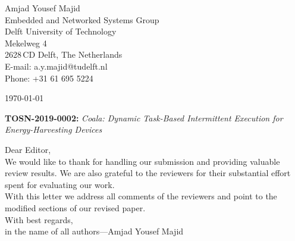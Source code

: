 \documentclass[10pt]{article}
\begin{document}
\pagestyle{myheadings}
\thispagestyle{empty}


\headsep 0.5cm

\bigskip\bigskip


\bigskip\bigskip

\begin{flushright}
Amjad Yousef Majid \\
Embedded and Networked Systems Group \\ 
Delft University of Technology \\ 
Mekelweg 4\\
2628\,CD Delft, The Netherlands \\
E-mail: a.y.majid@tudelft.nl\\
Phone: +31 61 695 5224\\
\end{flushright}

\vspace*{2cm}

\today
\medskip


\textbf{TOSN-2019-0002:} {\sl Coala: Dynamic Task-Based Intermittent Execution for Energy-Harvesting Devices}

\bigskip

Dear Editor,\\

We would like to thank for handling our submission and providing valuable review results. 
We are also grateful to the reviewers for their substantial effort spent for evaluating our work. \\

With this letter we address all comments of the reviewers and point to the modified sections of our revised paper. \\

With best regards, \\

in the name of all authors---Amjad Yousef Majid

\pagebreak
\end{document}
